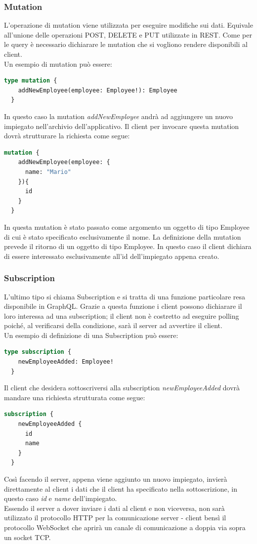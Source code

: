 \subsubsection*{Mutation}
L'operazione di mutation viene utilizzata per eseguire modifiche sui dati. Equivale all'unione delle operazioni POST, DELETE e PUT utilizzate in REST. Come per le query è necessario dichiarare le mutation che si vogliono rendere disponibili al client.\\
Un esempio di mutation può essere:
\begin{lstlisting}[language=GraphQL,]
  type mutation {
    addNewEmployee(employee: Employee!): Employee
  }
\end{lstlisting}
In questo caso la mutation \textit{addNewEmployee} andrà ad aggiungere un nuovo impiegato nell'archivio dell'applicativo. Il client per invocare questa mutation dovrà strutturare la richiesta come segue:
\begin{lstlisting}[language=GraphQL,]
  mutation {
    addNewEmployee(employee: {
      name: "Mario"
    }){
      id
    }
  }
\end{lstlisting}
In questa mutation è stato passato come argomento un oggetto di tipo Employee di cui è stato specificato esclusivamente il nome. La definizione della mutation prevede il ritorno di un oggetto di tipo Employee. In questo caso il client dichiara di essere interessato esclusivamente all'id dell'impiegato appena creato.
\subsubsection*{Subscription}
L'ultimo tipo si chiama Subscription e si tratta di una funzione particolare resa disponibile in GraphQL. Grazie a questa funzione i client possono dichiarare il loro interessa ad una subscription; il client non è costretto ad eseguire polling poiché, al verificarsi della condizione, sarà il server ad avvertire il client.\\
Un esempio di definizione di una Subscription può essere:
\begin{lstlisting}[language=GraphQL,]
  type subscription {
    newEmployeeAdded: Employee!
  }
\end{lstlisting}
Il client che desidera sottoscriversi alla subscription \textit{newEmployeeAdded} dovrà mandare una richiesta strutturata come segue:
\begin{lstlisting}[language=GraphQL,]
  subscription {
    newEmployeeAdded {
      id
      name
    }
  }
\end{lstlisting}
Così facendo il server, appena viene aggiunto un nuovo impiegato, invierà direttamente al client i dati che il client ha specificato nella sottoscrizione, in questo caso \textit{id} e \textit{name} dell'impiegato.\\
Essendo il server a dover inviare i dati al client e non viceversa, non sarà utilizzato il protocollo HTTP per la comunicazione server - client bensì il protocollo WebSocket che aprirà un canale di comunicazione a doppia via sopra un socket TCP.\
